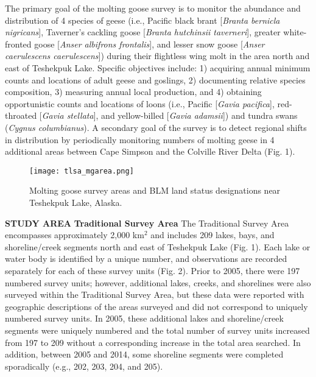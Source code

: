 \documentclass[]{article}
\begin{document}
The primary goal of the molting goose survey is to monitor the abundance
and distribution of 4 species of geese (i.e., Pacific black brant
{[}\textit{Branta bernicla nigricans}{]}, Taverner's cackling goose
{[}\textit{Branta hutchinsii taverneri}{]}, greater white-fronted goose
{[}\textit{Anser albifrons frontalis}{]}, and lesser snow goose
{[}\textit{Anser caerulescens caerulescens}{]}) during their flightless
wing molt in the area north and east of Teshekpuk Lake. Specific
objectives include: 1) acquiring annual minimum counts and locations of
adult geese and goslings, 2) documenting relative species composition,
3) measuring annual local production, and 4) obtaining opportunistic
counts and locations of loons (i.e., Pacific
{[}\textit{Gavia pacifica}{]}, red-throated
{[}\textit{Gavia stellata}{]}, and yellow-billed
{[}\textit{Gavia adamsii}{]}) and tundra swans
(\textit{Cygnus columbianus}). A secondary goal of the survey is to
detect regional shifts in distribution by periodically monitoring
numbers of molting geese in 4 additional areas between Cape Simpson and
the Colville River Delta (Fig. 1).

\begin{figure}[h]
\texttt{[image: tlsa\_mgarea.png]}
\caption{Molting goose survey areas and BLM land status designations near Teshekpuk Lake, Alaska.}
\end{figure}

\textbf{STUDY AREA}\hfill\break
\textbf{Traditional Survey Area}\hfill\break
The Traditional Survey Area encompasses approximately 2,000 km\(^{2}\)
and includes 209 lakes, bays, and shoreline/creek segments north and
east of Teshekpuk Lake (Fig. 1). Each lake or water body is identified
by a unique number, and observations are recorded separately for each of
these survey units (Fig. 2). Prior to 2005, there were 197 numbered
survey units; however, additional lakes, creeks, and shorelines were
also surveyed within the Traditional Survey Area, but these data were
reported with geographic descriptions of the areas surveyed and did not
correspond to uniquely numbered survey units. In 2005, these additional
lakes and shoreline/creek segments were uniquely numbered and the total
number of survey units increased from 197 to 209 without a corresponding
increase in the total area searched. In addition, between 2005 and 2014,
some shoreline segments were completed sporadically (e.g., 202, 203,
204, and 205).
\end{document}
